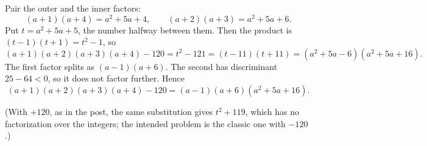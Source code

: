 Pair the outer and the inner factors:
\[(a+1)(a+4)=a^2+5a+4,\qquad (a+2)(a+3)=a^2+5a+6 .\]
Put $t=a^2+5a+5$, the number halfway between them. Then the product is $(t-1)(t+1)=t^2-1$, so
\[(a+1)(a+2)(a+3)(a+4)-120=t^2-121=(t-11)(t+11)=(a^2+5a-6)(a^2+5a+16).\]
The first factor splits as $(a-1)(a+6)$. The second has discriminant $25-64<0$, so it does not factor further. Hence
\[(a+1)(a+2)(a+3)(a+4)-120=\boxed{(a-1)(a+6)(a^2+5a+16)} .\]

(With $+120$, as in the post, the same substitution gives $t^2+119$, which has no factorization over the integers; the intended problem is the classic one with $-120$.)
